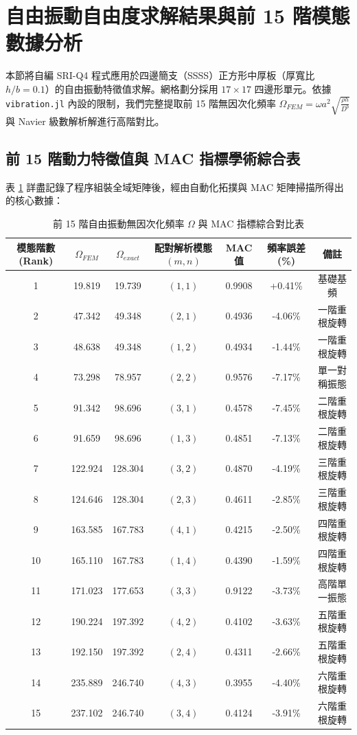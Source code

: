 \section{自由振動自由度求解結果與前 15 階模態數據分析}

本節將自編 SRI-Q4 程式應用於四邊簡支（SSSS）正方形中厚板（厚寬比 $h/b=0.1$）的自由振動特徵值求解。網格劃分採用 $17 \times 17$ 四邊形單元。依據 \texttt{vibration.jl} 內設的限制，我們完整提取前 15 階無因次化頻率 $\Omega_{FEM} = \omega a^2 \sqrt{\frac{\rho h}{D^b}}$ 與 Navier 級數解析解進行高階對比。

\subsection{前 15 階動力特徵值與 MAC 指標學術綜合表}
表 \ref{tab:vibration_15_modes} 詳盡記錄了程序組裝全域矩陣後，經由自動化拓撲與 MAC 矩陣掃描所得出的核心數據：

\begin{table}[h]
\centering
\caption{前 15 階自由振動無因次化頻率 $\Omega$ 與 MAC 指標綜合對比表}
\label{tab:vibration_15_modes}
\begin{tabular}{ccccccc}
\toprule
模態階數 (Rank) & $\Omega_{FEM}$ & $\Omega_{exact}$ & 配對解析模態 $(m,n)$ & MAC 值 & 頻率誤差 (\%) & 備註 \\
\midrule
1 & 19.819 & 19.739 & $(1,1)$ & 0.9908 & +0.41\% & 基礎基頻 \\
2 & 47.342 & 49.348 & $(2,1)$ & 0.4936 & -4.06\% & 一階重根旋轉 \\
3 & 48.638 & 49.348 & $(1,2)$ & 0.4934 & -1.44\% & 一階重根旋轉 \\
4 & 73.298 & 78.957 & $(2,2)$ & 0.9576 & -7.17\% & 單一對稱振態 \\
5 & 91.342 & 98.696 & $(3,1)$ & 0.4578 & -7.45\% & 二階重根旋轉 \\
6 & 91.659 & 98.696 & $(1,3)$ & 0.4851 & -7.13\% & 二階重根旋轉 \\
7 & 122.924 & 128.304 & $(3,2)$ & 0.4870 & -4.19\% & 三階重根旋轉 \\
8 & 124.646 & 128.304 & $(2,3)$ & 0.4611 & -2.85\% & 三階重根旋轉 \\
9 & 163.585 & 167.783 & $(4,1)$ & 0.4215 & -2.50\% & 四階重根旋轉 \\
10 & 165.110 & 167.783 & $(1,4)$ & 0.4390 & -1.59\% & 四階重根旋轉 \\
11 & 171.023 & 177.653 & $(3,3)$ & 0.9122 & -3.73\% & 高階單一振態 \\
12 & 190.224 & 197.392 & $(4,2)$ & 0.4102 & -3.63\% & 五階重根旋轉 \\
13 & 192.150 & 197.392 & $(2,4)$ & 0.4311 & -2.66\% & 五階重根旋轉 \\
14 & 235.889 & 246.740 & $(4,3)$ & 0.3955 & -4.40\% & 六階重根旋轉 \\
15 & 237.102 & 246.740 & $(3,4)$ & 0.4124 & -3.91\% & 六階重根旋轉 \\
\bottomrule
\end{tabular}
\end{table}

